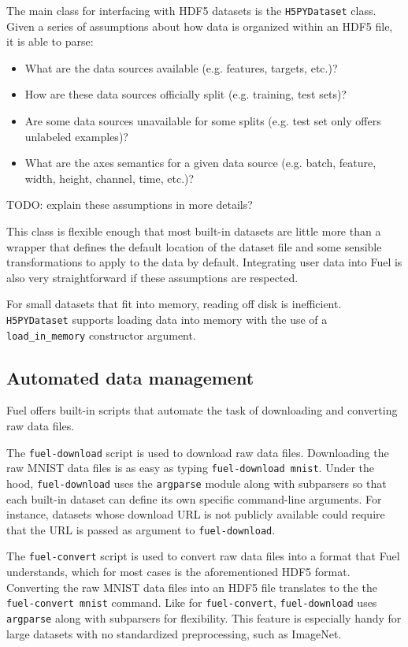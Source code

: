\documentclass[twoside,11pt]{article}
\begin{document}
The main class for interfacing with HDF5 datasets is the \lstinline$H5PYDataset$
class. Given a series of assumptions about how data is organized within an HDF5
file, it is able to parse:

\begin{itemize}
\item What are the data sources available (e.g. features, targets, etc.)?
\item How are these data sources officially split (e.g. training, test sets)?
\item Are some data sources unavailable for some splits (e.g. test set only
      offers unlabeled examples)?
\item What are the axes semantics for a given data source (e.g. batch, feature,
      width, height, channel, time, etc.)?
\end{itemize}

TODO: explain these assumptions in more details?

This class is flexible enough that most built-in datasets are little more than a
wrapper that defines the default location of the dataset file and some sensible
transformations to apply to the data by default. Integrating user data into Fuel
is also very straightforward if these assumptions are respected.

For small datasets that fit into memory, reading off disk is inefficient.
\lstinline$H5PYDataset$ supports loading data into memory with the use of a
\lstinline$load_in_memory$ constructor argument.

\subsection{Automated data management}

Fuel offers built-in scripts that automate the task of downloading and
converting raw data files.

The \lstinline$fuel-download$ script is used to download raw data files.
Downloading the raw MNIST data files is as easy as typing
\lstinline$fuel-download mnist$. Under the hood, \lstinline$fuel-download$ uses
the \lstinline$argparse$ module along with subparsers so that each built-in
dataset can define its own specific command-line arguments. For instance,
datasets whose download URL is not publicly available could require that
the URL is passed as argument to \lstinline$fuel-download$.

The \lstinline$fuel-convert$ script is used to convert raw data files into a
format that Fuel understands, which for most cases is the aforementioned HDF5
format. Converting the raw MNIST data files into an HDF5 file translates to the
the \lstinline$fuel-convert mnist$ command. Like for \lstinline$fuel-convert$,
\lstinline$fuel-download$ uses \lstinline$argparse$ along with subparsers for
flexibility. This feature is especially handy for large datasets with no
standardized preprocessing, such as ImageNet.
\end{document}
